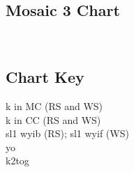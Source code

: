 \documentclass[12pt]{article}
\begin{document}
\vspace{-1in}
\begin{multicols}{2}
\subsection*{Mosaic 3 Chart}


\vfill
\columnbreak
~
\vspace{3em}

\begin{addmargin}[8em]{0em}
\subsection*{Chart Key}
\textknit{-} k in MC (RS and WS) \\

\textknit{=} k in CC (RS and WS) \\

 sl1 wyib (RS); sl1 wyif (WS) \\

 yo \\

\textknit{>} k2tog 
\end{addmargin}

\end{multicols}

\normalsize
\end{document}
